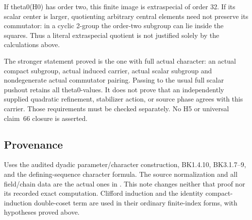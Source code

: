 If theta0(H0) has order two, this finite image is extraspecial of order
32. If its scalar center is larger, quotienting arbitrary central
elements need not preserve its commutator: in a cyclic 2-group the
order-two subgroup can lie inside the squares. Thus a literal
extraspecial quotient is not justified solely by the calculations above.

The stronger statement proved is the one with full actual character: an
actual compact subgroup, actual induced carrier, actual scalar subgroup
and nondegenerate actual commutator pairing. Passing to the usual full
scalar pushout retains all theta0-values. It does not prove that an
independently supplied quadratic refinement, stabilizer action, or
source phase agrees with this carrier. Those requirements must be
checked separately. No H5 or universal claim~66 closure is asserted.

\hypertarget{rank4-provenance}{%
\subsection{Provenance}\label{rank4-provenance}}

Uses the audited dyadic parameter/character construction, BK1.4.10,
BK3.1.7--9, and the defining-sequence character formula. The source
normalization and all field/chain data are the actual ones in
. This note changes neither that
proof nor its recorded exact computation. Clifford induction and the
identity compact-induction double-coset term are used in their ordinary
finite-index forms, with hypotheses proved above.
